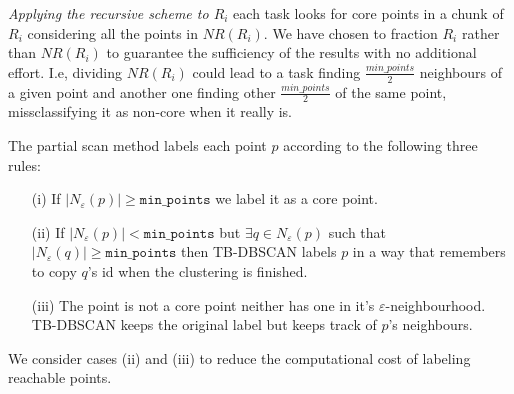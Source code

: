 \documentclass[10pt,journal,compsoc]{IEEEtran}
\begin{document}
\emph{Applying the recursive scheme to $R_i$} each task looks for core points in a chunk of $R_i$ considering all the points in $NR(R_i)$. We have chosen to fraction $R_i$ rather than $NR(R_i)$ to guarantee the sufficiency of the results with no additional effort. I.e, dividing $NR(R_i)$ could lead to a task finding $\frac{min\_points}{2}$ neighbours of a given point and another one finding other $\frac{min\_points}{2}$ of the same point, missclassifying it as non-core when it really is.

The partial scan method labels each point $p$ according to the following three rules:
\begin{itemize}
    \item[(i)] If $| N_{\varepsilon} (p) | \geq \texttt{min\_points}$ we label it as a core point.
    \item[(ii)] If $| N_{\varepsilon} (p) | < \texttt{min\_points}$ but $ \exists q \in  N_{\varepsilon} (p) $ such that $ | N_{\varepsilon} (q) | \geq \texttt{min\_points}$ then TB-DBSCAN labels $p$ in a way that remembers to copy $q$'s id when the clustering is finished.
    \item[(iii)] The point is not a core point neither has one in it's $\varepsilon$-neighbourhood. TB-DBSCAN keeps the original label but keeps track of $p$'s neighbours.
\end{itemize}
We consider cases (ii) and (iii) to reduce the computational cost of labeling reachable points.
\end{document}
